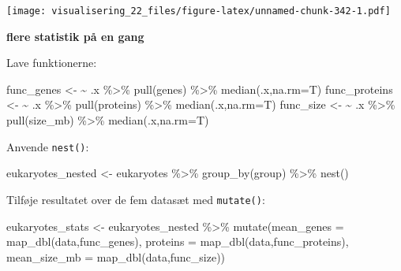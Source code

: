 \documentclass[
]{book}
\newenvironment{Shaded}{\begin{snugshade}}{\end{snugshade}}
\newcommand{\AttributeTok}[1]{\textcolor[rgb]{0.77,0.63,0.00}{#1}}
\newcommand{\ErrorTok}[1]{\textcolor[rgb]{0.64,0.00,0.00}{\textbf{#1}}}
\newcommand{\FunctionTok}[1]{\textcolor[rgb]{0.00,0.00,0.00}{#1}}
\newcommand{\NormalTok}[1]{#1}
\newcommand{\OtherTok}[1]{\textcolor[rgb]{0.56,0.35,0.01}{#1}}
\newcommand{\SpecialCharTok}[1]{\textcolor[rgb]{0.00,0.00,0.00}{#1}}
\begin{document}
\texttt{[image: visualisering\_22\_files/figure-latex/unnamed-chunk-342-1.pdf]}

\textbf{flere statistik på en gang}

Lave funktionerne:

\begin{Shaded}
\begin{Highlighting}[]
\NormalTok{func\_genes }\OtherTok{\textless{}{-}}    \ErrorTok{\textasciitilde{}}\NormalTok{ .x }\SpecialCharTok{\%\textgreater{}\%} \FunctionTok{pull}\NormalTok{(genes)     }\SpecialCharTok{\%\textgreater{}\%} \FunctionTok{median}\NormalTok{(.x,}\AttributeTok{na.rm=}\NormalTok{T)}
\NormalTok{func\_proteins }\OtherTok{\textless{}{-}} \ErrorTok{\textasciitilde{}}\NormalTok{ .x }\SpecialCharTok{\%\textgreater{}\%} \FunctionTok{pull}\NormalTok{(proteins)  }\SpecialCharTok{\%\textgreater{}\%} \FunctionTok{median}\NormalTok{(.x,}\AttributeTok{na.rm=}\NormalTok{T)}
\NormalTok{func\_size }\OtherTok{\textless{}{-}}     \ErrorTok{\textasciitilde{}}\NormalTok{ .x }\SpecialCharTok{\%\textgreater{}\%} \FunctionTok{pull}\NormalTok{(size\_mb)   }\SpecialCharTok{\%\textgreater{}\%} \FunctionTok{median}\NormalTok{(.x,}\AttributeTok{na.rm=}\NormalTok{T)}
\end{Highlighting}
\end{Shaded}

Anvende \texttt{nest()}:

\begin{Shaded}
\begin{Highlighting}[]
\NormalTok{eukaryotes\_nested }\OtherTok{\textless{}{-}}\NormalTok{ eukaryotes }\SpecialCharTok{\%\textgreater{}\%} 
  \FunctionTok{group\_by}\NormalTok{(group) }\SpecialCharTok{\%\textgreater{}\%} 
  \FunctionTok{nest}\NormalTok{() }
\end{Highlighting}
\end{Shaded}

Tilføje resultatet over de fem datasæt med \texttt{mutate()}:

\begin{Shaded}
\begin{Highlighting}[]
\NormalTok{eukaryotes\_stats }\OtherTok{\textless{}{-}}\NormalTok{ eukaryotes\_nested }\SpecialCharTok{\%\textgreater{}\%}
  \FunctionTok{mutate}\NormalTok{(}\AttributeTok{mean\_genes =} \FunctionTok{map\_dbl}\NormalTok{(data,func\_genes),}
         \AttributeTok{proteins =} \FunctionTok{map\_dbl}\NormalTok{(data,func\_proteins),}
         \AttributeTok{mean\_size\_mb =} \FunctionTok{map\_dbl}\NormalTok{(data,func\_size))}
\end{Highlighting}
\end{Shaded}
\end{document}
